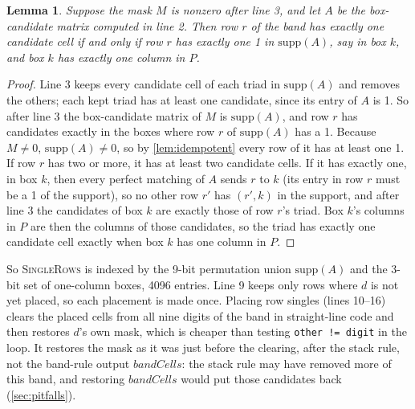 \documentclass[11pt]{article}
\newtheorem{lemma}[theorem]{Lemma}
\theoremstyle{definition}
\theoremstyle{plain}
\let\origtextsc\textsc
\renewcommand{\textsc}[1]{\textup{\origtextsc{#1}}}
\begin{document}
\begin{lemma}
\label{lem:singlerows}
Suppose the mask $M$ is nonzero after line 3, and let $A$ be the box-candidate matrix computed in line 2. Then row $r$ of the
band has exactly one candidate cell if and only if row $r$ has exactly one 1 in $\mathrm{supp}(A)$, say in box $k$, and
box $k$ has exactly one column in $P$.
\end{lemma}
\begin{proof}
Line 3 keeps every candidate cell of each triad in $\mathrm{supp}(A)$ and removes the others; each kept triad has
at least one candidate, since its entry of $A$ is 1. So after line 3 the box-candidate matrix of $M$ is $\mathrm{supp}(A)$,
and row $r$ has candidates exactly in the boxes where row $r$ of $\mathrm{supp}(A)$ has a 1. Because $M\neq 0$,
$\mathrm{supp}(A)\neq 0$, so by \cref{lem:idempotent} every row of it has at least one 1. If row $r$ has two or more, it
has at least two candidate cells. If it has exactly one, in box $k$, then every perfect matching of $A$ sends $r$ to $k$
(its entry in row $r$ must be a 1 of the support), so no other row $r'$ has $(r',k)$ in the support, and after line 3
the candidates of box $k$ are exactly those of row $r$'s triad. Box $k$'s columns in $P$ are then the columns of
those candidates, so the triad has exactly one candidate cell exactly when box $k$ has one column in $P$.
\end{proof}

\noindent So \textsc{SingleRows} is indexed by the 9-bit permutation union $\mathrm{supp}(A)$ and the 3-bit set of one-column boxes, 4096
entries. Line 9 keeps only rows where $d$ is not yet placed, so each placement is made once. Placing row singles (lines 10--16) clears the placed cells from all nine digits of the band in straight-line code and
then restores $d$'s own mask, which is cheaper than testing \texttt{other != digit} in the loop. It restores the mask
as it was just before the clearing, after the stack rule, not the band-rule output $\mathit{bandCells}$: the stack rule
may have removed more of this band, and restoring $\mathit{bandCells}$ would put those candidates back (\cref{sec:pitfalls}).
\end{document}
